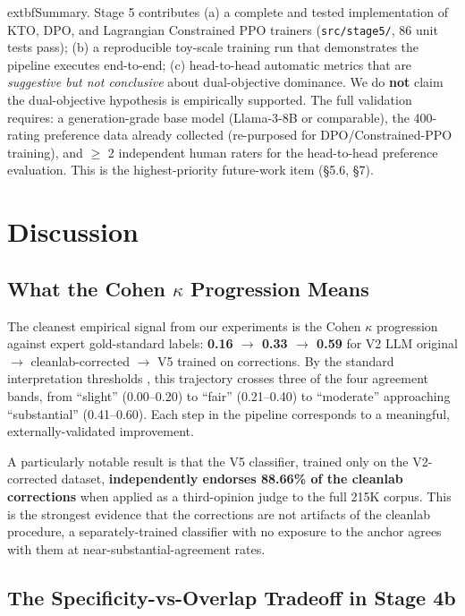 \documentclass[sigconf, nonacm, anonymous, balance=false]{acmart}
\begin{document}
	extbf{Summary.} Stage 5 contributes (a) a complete and tested implementation of KTO, DPO, and Lagrangian Constrained PPO trainers (\texttt{src/stage5/}, 86 unit tests pass); (b) a reproducible toy-scale training run that demonstrates the pipeline executes end-to-end; (c) head-to-head automatic metrics that are \emph{suggestive but not conclusive} about dual-objective dominance. We do \textbf{not} claim the dual-objective hypothesis is empirically supported. The full validation requires: a generation-grade base model (Llama-3-8B or comparable), the 400-rating preference data already collected (re-purposed for DPO/Constrained-PPO training), and $\geq$ 2 independent human raters for the head-to-head preference evaluation. This is the highest-priority future-work item (\S5.6, \S7).

\section{Discussion}\label{discussion}

\subsection{What the Cohen $\kappa$ Progression Means}\label{what-the-cohen-ux3ba-progression-means}

The cleanest empirical signal from our experiments is the Cohen $\kappa$ progression against expert gold-standard labels: \textbf{0.16 $\rightarrow$ 0.33 $\rightarrow$ 0.59} for V2 LLM original $\rightarrow$ cleanlab-corrected $\rightarrow$ V5 trained on corrections. By the standard interpretation thresholds \cite{landis1977}, this trajectory crosses three of the four agreement bands, from ``slight'' (0.00--0.20) to ``fair'' (0.21--0.40) to ``moderate'' approaching ``substantial'' (0.41--0.60). Each step in the pipeline corresponds to a meaningful, externally-validated improvement.

A particularly notable result is that the V5 classifier, trained only on the V2-corrected dataset, \textbf{independently endorses 88.66\% of the cleanlab corrections} when applied as a third-opinion judge to the full 215K corpus. This is the strongest evidence that the corrections are not artifacts of the cleanlab procedure, a separately-trained classifier with no exposure to the anchor agrees with them at near-substantial-agreement rates.

\subsection{The Specificity-vs-Overlap Tradeoff in Stage 4b}\label{the-specificity-vs-overlap-tradeoff-in-stage-4b}
\end{document}
